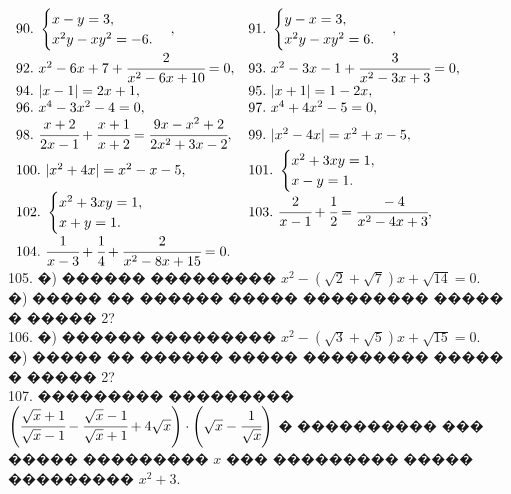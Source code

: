 \documentclass[12pt]{article}
\begin{document}
$\begin{array}{ll}
90.\ \begin{cases}
x-y=3,\\
x^2y-xy^2=-6.
\end{cases},&
91.\ \begin{cases}
y-x=3,\\
x^2y-xy^2=6.
\end{cases},\\
92.\ x^2-6x+7+\cfrac{2}{x^2-6x+10}=0,&
93.\ x^2-3x-1+\cfrac{3}{x^2-3x+3}=0,\\
94.\ |x-1|=2x+1,&
95.\ |x+1|=1-2x,\\
96.\ x^4-3x^2-4=0,&
97.\ x^4+4x^2-5=0, \\
98.\ \cfrac{x+2}{2x-1}+\cfrac{x+1}{x+2}=\cfrac{9x-x^2+2}{2x^2+3x-2},&
99.\ |x^2-4x|=x^2+x-5,\\
100.\ |x^2+4x|=x^2-x-5,&
101.\ \begin{cases} x^2+3xy=1,\\ x-y=1.\end{cases}\\
102.\ \begin{cases} x^2+3xy=1,\\ x+y=1.\end{cases}&
103.\ \cfrac{2}{x-1}+\cfrac{1}{2}=\cfrac{-4}{x^2-4x+3},\\
104.\ \cfrac{1}{x-3}+\cfrac{1}{4}+\cfrac{2}{x^2-8x+15}=0.
\end{array}$\\
105. �) ������ ��������� $x^2-(\sqrt{2}+\sqrt{7})x+\sqrt{14}=0.$\\
�) ����� �� ������ ����� ��������� ����� � ����� 2?\\
106. �) ������ ��������� $x^2-(\sqrt{3}+\sqrt{5})x+\sqrt{15}=0.$\\
�) ����� �� ������ ����� ��������� ����� � ����� 2?\\
107. ��������� ��������� $\left(\cfrac{\sqrt{x}+1}{\sqrt{x}-1}-\cfrac{\sqrt{x}-1}{\sqrt{x}+1}+4\sqrt{x}\right)\cdot\left(\sqrt{x}-\cfrac{1}{\sqrt{x}}\right)$ � ���������� ��� ����� ��������� $x$ ��� ��������� ����� ��������� $x^2+3.$\\
\end{document}
